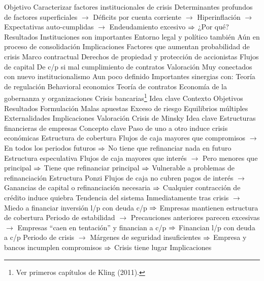 \documentclass{nuevotema}
\begin{document}
\begin{esquemal}
				\4 Objetivo
				\4[] Caracterizar factores institucionales de crisis
				\4[] Determinantes profundos de factores superficiales
				\4[] $\to$ Déficits por cuenta corriente
				\4[] $\to$ Hiperinflación
				\4[] $\to$ Expectativas auto-cumplidas
				\4[] $\to$ Endeudamiento excesivo
				\4[] $\Rightarrow$ ¿Por qué?
				\4 Resultados
				\4[] Instituciones son importantes
				\4[] Entorno legal y político también
				\4[] Aún en proceso de consolidación
			\3 Implicaciones
				\4 Factores que aumentan probabilidad de crisis
				\4[] Marco contractual
				\4[] Derechos de propiedad y protección de accionistas
				\4 Flujos de capital
				\4[] De c/p si mal cumplimiento de contratos
			\3 Valoración
				\4 Muy conectados con nuevo institucionalismo
				\4 Aun poco definido
				\4 Importantes sinergias con:
				\4[] Teoría de regulación
				\4[] Behavioral economics
				\4[] Teoría de contratos
				\4[] Economía de la gobernanza y organizaciones
		\2 Crisis bancarias\footnote{Ver primeros capítulos de Kling (2011).}
			\3 Idea clave
				\4 Contexto
				\4 Objetivos
				\4 Resultados
			\3 Formulación
				\4 Malas apuestas
				\4 Exceso de riesgo
				\4 Equilibrios múltiples
				\4 Externalidades
			\3 Implicaciones
			\3 Valoración
		\2 Crisis de Minsky
			\3 Idea clave
				\4 Estructuras financieras de empresas
				\4[] Concepto clave
				\4[] Paso de uno a otro induce crisis económicas
				\4[i] Estructura de cobertura
				\4[] Flujos de caja mayores que compromisos
				\4[] $\to$ En todos los periodos futuros
				\4[] $\Rightarrow$ No tiene que refinanciar nada en futuro
				\4[ii] Estructura especulativa
				\4[] Flujos de caja mayores que interés
				\4[] $\to$ Pero menores que principal
				\4[] $\Rightarrow$ Tiene que refinanciar principal
				\4[] $\Rightarrow$ Vulnerable a problemas de refinanciación
				\4[iii] Estructura Ponzi
				\4[] Flujos de caja no cubren pagos de interés
				\4[] $\to$ Ganancias de capital o refinanciación necesaria
				\4[] $\Rightarrow$ Cualquier contracción de crédito induce quiebra
				\4 Tendencia del sistema
				\4[] Inmediatamente tras crisis
				\4[] $\to$ Miedo a financiar inversión l/p con deuda c/p
				\4[] $\Rightarrow$ Empresas mantienen estructura de cobertura
				\4[] Periodo de estabilidad
				\4[] $\to$ Precauciones anteriores parecen excesivas
				\4[] $\to$ Empresas ``caen en tentación'' y financian a c/p
				\4[] $\Rightarrow$ Financian l/p con deuda a c/p
				\4[] Periodo de crisis
				\4[] $\to$ Márgenes de seguridad insuficientes
				\4[] $\Rightarrow$ Empresa y bancos incumplen compromisos
				\4[] $\Rightarrow$ Crisis tiene lugar
			\3 Implicaciones

\end{esquemal}
\end{document}
